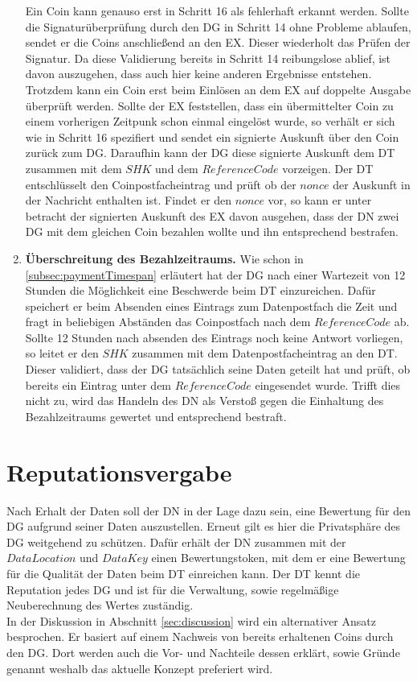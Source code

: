 \documentclass[
	fontsize=11pt,
	headings=small,
	parskip=half,           %
	bibliography=totoc,
	numbers=noenddot,       %
	open=any,               %
]{scrreprt}
\begin{document}
\begin{enumerate}
    Ein Coin kann genauso erst in Schritt 16 als fehlerhaft erkannt werden. Sollte die Signaturüberprüfung durch den DG in Schritt 14 ohne Probleme ablaufen, sendet er die Coins anschließend an den EX. Dieser wiederholt das Prüfen der Signatur. Da diese Validierung bereits in Schritt 14 reibungslose ablief, ist davon auszugehen, dass auch hier keine anderen Ergebnisse entstehen. Trotzdem kann ein Coin erst beim Einlösen an dem EX auf doppelte Ausgabe überprüft werden. Sollte der EX feststellen, dass ein übermittelter Coin zu einem vorherigen Zeitpunk schon einmal eingelöst wurde, so verhält er sich wie in Schritt 16 spezifiert und sendet ein signierte Auskunft über den Coin zurück zum DG. Daraufhin kann der DG diese signierte Auskunft dem DT zusammen mit dem $SHK$ und dem $ReferenceCode$ vorzeigen. Der DT entschlüsselt den Coinpostfacheintrag und prüft ob der $nonce$ der Auskunft in der Nachricht enthalten ist. Findet er den $nonce$ vor, so kann er unter betracht der signierten Auskunft des EX davon ausgehen, dass der DN zwei DG mit dem gleichen Coin bezahlen wollte und ihn entsprechend bestrafen.

    \item \textbf{Überschreitung des Bezahlzeitraums.} \label{case:paymentExceeded}
    Wie schon in \ref{subsec:paymentTimespan} erläutert hat der DG nach einer Wartezeit von 12 Stunden die Möglichkeit eine Beschwerde beim DT einzureichen. Dafür speichert er beim Absenden eines Eintrags zum Datenpostfach die Zeit und fragt in beliebigen Abständen das Coinpostfach nach dem $ReferenceCode$ ab. Sollte 12 Stunden nach absenden des Eintrags noch keine Antwort vorliegen, so leitet er den $SHK$ zusammen mit dem Datenpostfacheintrag an den DT. Dieser validiert, dass der DG tatsächlich seine Daten geteilt hat und prüft, ob bereits ein Eintrag unter dem $ReferenceCode$ eingesendet wurde. Trifft dies nicht zu, wird das Handeln des DN als Verstoß gegen die Einhaltung des Bezahlzeitraums gewertet und entsprechend bestraft.
\end{enumerate}


\section{Reputationsvergabe}
\label{system:reputation}
Nach Erhalt der Daten soll der DN in der Lage dazu sein, eine Bewertung für den DG aufgrund seiner Daten auszustellen. Erneut gilt es hier die Privatsphäre des DG weitgehend zu schützen. Dafür erhält der DN zusammen mit der $DataLocation$ und $DataKey$ einen Bewertungstoken, mit dem er eine Bewertung für die Qualität der Daten beim DT einreichen kann. Der DT kennt die Reputation jedes DG und ist für die Verwaltung, sowie regelmäßige Neuberechnung des Wertes zuständig.\\
In der Diskussion in Abschnitt \ref{sec:discussion} wird ein alternativer Ansatz besprochen. Er basiert auf einem Nachweis von bereits erhaltenen Coins durch den DG. Dort werden auch die Vor- und Nachteile dessen erklärt, sowie Gründe genannt weshalb das aktuelle Konzept preferiert wird.
\end{document}
